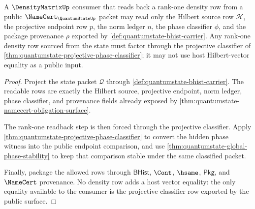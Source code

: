 \begin{theorem}
\label{thm:quantumstate-densitymatrix-readback-boundary}
A $\DensityMatrixUp$ consumer that reads back a rank-one density row from a
public $\NameCert_{\QuantumStateUp}$ packet may read only the Hilbert source
row $\mathcal{H}$, the projective endpoint row $p$, the norm ledger $n$, the
phase classifier $\phi$, and the package provenance $\rho$ exported by
\autoref{def:quantumstate-bhist-carrier}. Any rank-one density row sourced
from the state must factor through the projective classifier of
\autoref{thm:quantumstate-projective-phase-classifier}; it may not use host
Hilbert-vector equality as a public input.
\end{theorem}
\begin{proof}
Project the state packet $\mathcal{Q}$ through
\autoref{def:quantumstate-bhist-carrier}. The readable rows are exactly the
Hilbert source, projective endpoint, norm ledger, phase classifier, and
provenance fields already exposed by
\autoref{thm:quantumstate-namecert-obligation-surface}.

The rank-one readback step is then forced through the projective classifier.
Apply \autoref{thm:quantumstate-projective-phase-classifier} to convert the
hidden phase witness into the public endpoint comparison, and use
\autoref{thm:quantumstate-global-phase-stability} to keep that comparison
stable under the same classified packet.

Finally, package the allowed rows through $\mathsf{BHist}$, $\Cont$,
$\hsame$, $\mathsf{Pkg}$, and $\NameCert$ provenance. No density row adds a
host vector equality: the only equality available to the consumer is the
projective classifier row exported by the public surface.
\end{proof}

